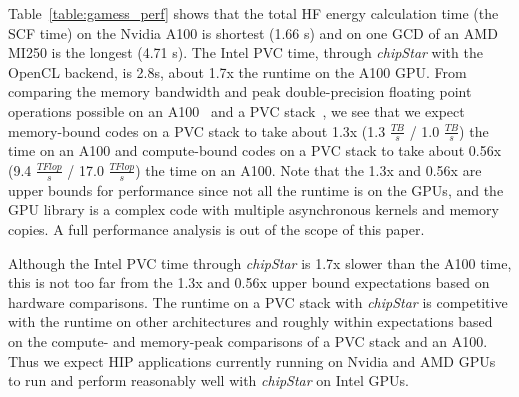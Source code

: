 \documentclass[Afour,sageh,times]{sagej}
\newcommand{\chipstar}{\textit{chipStar}\xspace}
\newcommand{\mycite}[1]{\citep{#1}}
\begin{document}
Table~\ref{table:gamess_perf} shows that the total HF energy calculation time (the SCF time) on the Nvidia A100 is shortest (1.66 s) and on one GCD of an AMD MI250 is the longest (4.71 s). The Intel PVC time, through \chipstar with the OpenCL backend, is 2.8s, about 1.7x the runtime on the A100 GPU. From comparing the memory bandwidth and peak double-precision floating point operations possible on an A100~\mycite{a100_measured} and a PVC stack~\mycite{applencourt2024ponte}, we see that we expect memory-bound codes on a PVC stack to take about 1.3x (1.3 $\frac{TB}{s}$ / 1.0 $\frac{TB}{s}$) the time on an A100 and compute-bound codes on a PVC stack to take about 0.56x (9.4 $\frac{TFlop}{s}$ / 17.0 $\frac{TFlop}{s}$) the time on an A100. Note that the 1.3x and 0.56x are upper bounds for performance since not all the runtime is on the GPUs, and the GPU library is a complex code with multiple asynchronous kernels and memory copies. A full performance analysis is out of the scope of this paper. 

Although the Intel PVC time through \chipstar is 1.7x slower than the A100 time, this is not too far from the 1.3x and 0.56x upper bound expectations based on hardware comparisons. The runtime on a PVC stack with \chipstar is competitive with the runtime on other architectures and roughly within expectations based on the compute- and memory-peak comparisons of a PVC stack and an A100. Thus we expect HIP applications currently running on Nvidia and AMD GPUs to run and perform reasonably well with \chipstar on Intel GPUs.
\end{document}

